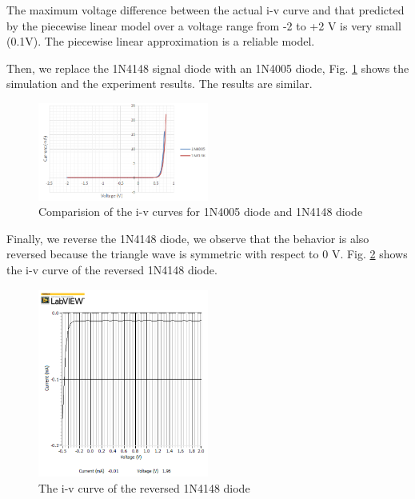 \documentclass[letterpaper, 10 pt, conference]{ieeeconf}  %
\begin{document}
\par The maximum voltage difference between the actual i-v curve and that predicted by the piecewise linear model over a voltage range from -2 to +2 V is very small (0.1V). The piecewise linear approximation is a reliable model.
\par Then, we replace the 1N4148 signal diode with an 1N4005 diode, Fig. \ref{fig:6} shows the simulation and the experiment results. The results are similar.
\begin{figure}[h]
  \centering
  \includegraphics[width=0.5\textwidth]{images/result5.png}
  \caption{Comparision of the i-v curves for 1N4005 diode and 1N4148 diode}
  \label{fig:6}
\end{figure}
\newpage
\par Finally, we reverse the 1N4148 diode, we observe that the behavior is also reversed because the triangle wave is symmetric with respect to 0 V. Fig. \ref{fig:7} shows the i-v curve of the reversed 1N4148 diode.
\begin{figure}[h]
  \centering
  \includegraphics[width=0.5\textwidth]{images/result6.png}
  \caption{The i-v curve of the reversed 1N4148 diode}
  \label{fig:7}
\end{figure}
\clearpage
\end{document}
